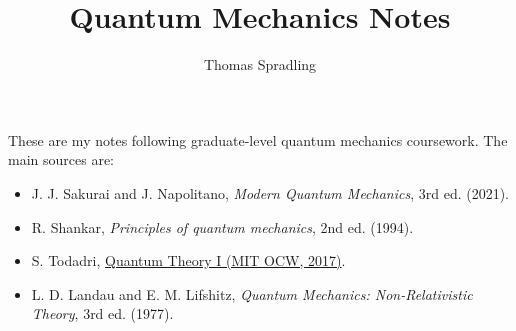 \documentclass[12pt]{article}
\title{Quantum Mechanics Notes}
\author{Thomas Spradling}
\date{}
\begin{document}
\maketitle

These are my notes following graduate-level quantum mechanics coursework. The main sources are:

\begin{itemize}
    \item J. J. Sakurai and J. Napolitano, \emph{Modern Quantum Mechanics}, 3rd ed. (2021).
    \item R. Shankar, \emph{Principles of quantum mechanics}, 2nd ed. (1994).
    \item S. Todadri, \href{https://ocw.mit.edu/courses/8-321-quantum-theory-i-fall-2017/}{Quantum Theory I (MIT OCW, 2017)}.
    \item L. D. Landau and E. M. Lifshitz, \emph{Quantum Mechanics: Non-Relativistic Theory}, 3rd ed. (1977).
\end{itemize}

\clearpage
\tableofcontents
\clearpage










\end{document}
